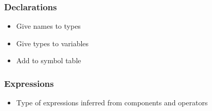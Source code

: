 \documentclass[usepdftitle=false,professionalfonts,compress ]{beamer}
\begin{document}
{
\begin{frame}\frametitle{Declarations}

	\begin{itemize}
	\item Give names to types
			\item Give types to variables
			\item Add to symbol table
				\end{itemize}

\end{frame}}





{
\begin{frame}\frametitle{Expressions}

	\begin{itemize}
	\item Type of expressions inferred from components and operators
				\end{itemize}

\end{frame}}
\end{document}
